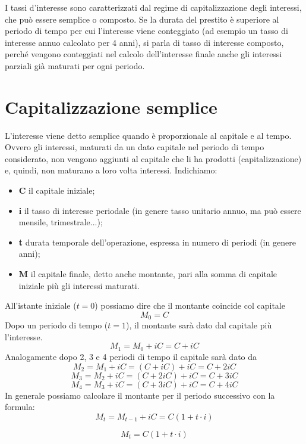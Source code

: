 \vspace{.4cm}

I tassi d'interesse sono caratterizzati dal regime di capitalizzazione 
degli interessi, che può essere semplice o composto. Se la durata del 
prestito è superiore al periodo di tempo per cui l'interesse viene 
conteggiato (ad esempio un tasso di interesse annuo calcolato per 4 anni), 
si parla di tasso di interesse composto, perché vengono conteggiati nel 
calcolo dell'interesse finale anche gli interessi parziali già maturati per 
ogni periodo.

\section{Capitalizzazione semplice}
L'interesse viene detto semplice quando è proporzionale al capitale e al 
tempo. 
Ovvero gli interessi, maturati da un dato capitale nel periodo di 
tempo considerato, non vengono aggiunti al capitale che li ha prodotti 
(capitalizzazione) e, quindi, non maturano a loro volta interessi. 
Indichiamo:

\begin{itemize}
\item \textbf{C} il capitale iniziale;
\item \textbf{i} il tasso di interesse periodale (in genere tasso unitario 
annuo, ma può essere mensile, trimestrale...);
\item \textbf{t} durata temporale dell'operazione, espressa in numero di 
periodi (in genere anni);
\item \textbf{M} il capitale finale, detto anche montante, pari alla somma 
di capitale iniziale più gli interessi maturati. 
\end{itemize}

All'istante iniziale (\(t=0\)) possiamo dire che il montante coincide col 
capitale 
\[ M_{0}=C \]
Dopo un periodo di tempo (\(t=1\)), il montante sarà dato dal capitale più 
l'interesse. 
\[ M_{1}=M_{0} +iC = C + iC \]
Analogamente dopo 2, 3 e 4 periodi di tempo il capitale sarà dato da 
\[ M_{2}=M_{1} +iC = (C + iC) +iC = C +2iC\]
\[ M_{3}=M_{2} +iC = (C + 2iC) +iC = C +3iC\]
\[ M_{4}=M_{3} +iC = (C + 3iC) +iC = C +4iC\]
In generale possiamo calcolare il montante per il periodo successivo con la 
formula:
\[ M_{t}=M_{t-1}+iC=C(1+t\cdot i) \]
\begin{definizione}
\[ M_{t}=C(1+t\cdot i) \]
\end{definizione}

